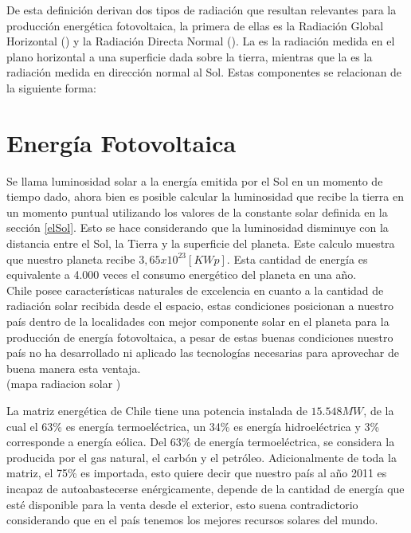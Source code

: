 De esta definición derivan dos tipos de radiación que resultan relevantes para la producción energética fotovoltaica, la primera de ellas es la Radiación Global Horizontal () y la Radiación Directa Normal (). La  es la radiación medida en el plano horizontal a una superficie dada sobre la tierra, mientras que la  es la radiación medida en dirección normal al Sol. Estas componentes se relacionan de la siguiente forma:\\ 

\section{Energía Fotovoltaica}
Se llama luminosidad solar a la energía emitida por el Sol en un momento de tiempo dado, ahora bien es posible calcular la luminosidad que recibe la tierra en un momento puntual utilizando los valores de la constante solar definida en la sección \ref{elSol}. Esto se hace considerando que la luminosidad disminuye con la distancia entre el Sol, la Tierra y la superficie del planeta. Este calculo muestra que nuestro planeta recibe $3,65 x {10}^{23} [KWp]$. Esta cantidad de energía es equivalente a 4.000 veces el consumo energético del planeta en una año.\\

Chile posee características naturales de excelencia en cuanto a la cantidad de radiación solar recibida desde el espacio, estas condiciones posicionan a nuestro país dentro de la localidades con mejor componente solar en el planeta para la producción de energía fotovoltaica, a pesar de estas buenas condiciones nuestro país no ha desarrollado ni aplicado las tecnologías necesarias para aprovechar de buena manera esta ventaja.\\

(mapa radiacion solar )

La matriz energética de Chile tiene una potencia instalada de $15.548 MW$\cite{matrizEnergia:1}, de la cual el 63\% es energía termoeléctrica, un 34\% es energía hidroeléctrica y 3\% corresponde a energía eólica. Del 63\% de energía termoeléctrica, se considera la producida por el gas natural, el carbón y el petróleo. Adicionalmente de toda la matriz, el 75\% es importada, esto quiere decir que nuestro país al año 2011 es incapaz de autoabastecerse enérgicamente, depende de la cantidad de energía que esté disponible para la venta desde el exterior, esto suena contradictorio considerando que en el país tenemos los mejores recursos solares del mundo.\\

